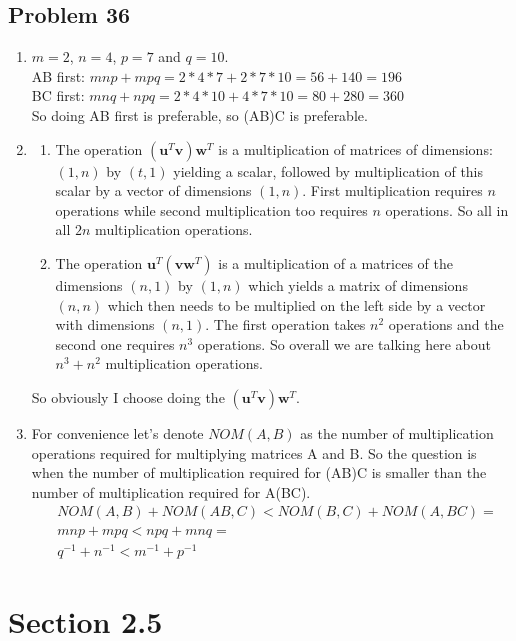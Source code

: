 \documentclass[a4paper,11pt]{article}
\newcommand{\mybf}[1]{\boldsymbol{#1}}
\begin{document}
\subsection*{Problem 36}
\begin{enumerate}[label=\alph*]
\item $m=2$, $n=4$, $p=7$ and $q=10$. \\
AB first: $mnp + mpq = 2*4*7 + 2*7*10 = 56 + 140 = 196$  \\
BC first: $mnq + npq = 2*4*10 + 4*7*10 = 80 + 280 = 360$ \\
So doing AB first is preferable, so (AB)C is preferable.
\item 
\begin{enumerate}
\item The operation $(\mybf{u}^T\mybf{v})\mybf{w}^T$ is a multiplication of matrices of dimensions: $(1,n)$ by $(t,1)$ yielding a scalar, followed by multiplication of this scalar by a vector of dimensions $(1,n)$. First multiplication requires $n$ operations while second multiplication too requires $n$ operations. So all in all $2n$ multiplication operations. 
\item The operation $\mybf{u}^T(\mybf{vw}^T)$ is a multiplication of a matrices of the dimensions $(n,1)$ by $(1,n)$ which yields a matrix of dimensions $(n,n)$ which then needs to be multiplied on the left side by a vector with dimensions $(n,1)$. The first operation takes $n^2$ operations and the second one requires $n^3$ operations. So overall we are talking here about $n^3+n^2$ multiplication operations.
\end{enumerate}
So obviously I choose doing the $(\mybf{u}^T\mybf{v})\mybf{w}^T$.
\item For convenience let's denote $NOM(A,B)$ as the number of multiplication operations required for multiplying matrices A and B. So the question is when the number of multiplication required for (AB)C is smaller than the number of multiplication required for A(BC).
\begin{subequations}
\begin{align}
    &NOM(A,B)+NOM(AB,C) < NOM(B,C)+NOM(A,BC) =\\
    &mnp+mpq < npq+mnq = \\
    &q^{-1}+n^{-1} < m^{-1}+p^{-1}
\end{align}
\end{subequations}
\end{enumerate}
\section*{Section 2.5}
\end{document}
